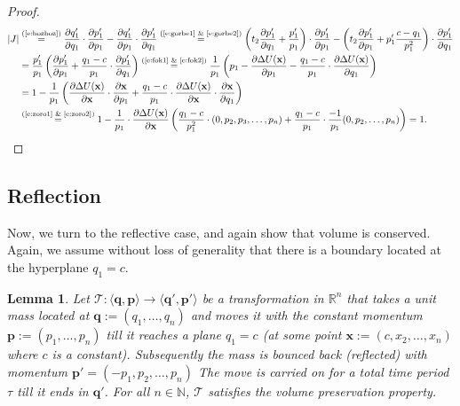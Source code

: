 \documentclass{article} %
\newtheorem{lemma}{Lemma}
\newcommand{\tuple}[1] {\langle #1 \rangle}
\newcommand{\bvec}[1]{\textbf{#1}}
\begin{document}
\begin{proof}
\begin{align*}\label{e:zarrafe1}
|J|
&\overset{\text{(\ref{e:bozboz})}}
=
\frac{\partial q'_1}{\partial q_1} \cdot \frac{\partial p'_1}{\partial p_1}
-
\frac{\partial q'_1}{\partial p_1} \cdot \frac{\partial p'_1}{\partial q_1}
\overset{\text{(\ref{e:gorbe1} \& \ref{e:gorbe2})}}
=
\left(
t_2 \frac{\partial p'_1}{\partial q_1}
+
\frac{p'_1}{p_1}
\right)
\cdot 
\frac{\partial p'_1}{\partial p_1}
-
\left(
t_2 \frac{\partial p'_1}{\partial p_1}
+
p'_1 \frac{c-q_1}{p_1^2}
\right)
\cdot \frac{\partial p'_1}{\partial q_1}\\
&= 
\frac{p'_1}{p_1} 
\left(
\frac{\partial p'_1}{\partial p_1} 
+
\frac{q_1 - c}{p_1} 
\cdot
\frac{\partial p'_1}{\partial q_1}
\right)
\overset{\text{(\ref{e:fok1} \& \ref{e:fok2})}}
=
\frac{1}{p_1} 
\left(
p_1 -
\frac{\partial \Delta U(\bvec{x})}{\partial p_1}%
-
\frac{q_1 - c}{p_1} 
\cdot
\frac{\partial{\Delta U(\bvec{x})}}{\partial q_1}%
\right)
\\
&=
1 - 
\frac{1}{p_1} 
\left(
\frac{\partial \Delta U(\bvec{x})}{\partial \bvec{x}}
\cdot
\frac{\partial \bvec{x}}{\partial p_1}%
+
\frac{q_1 - c}{p_1} 
\cdot
\frac{\partial{\Delta U(\bvec{x})}}
{\partial \bvec{x}}
\cdot
\frac{\partial \bvec{x}}
{\partial q_1}%
\right)
\\
&\overset{\text{(\ref{e:zoro1} \& \ref{e:zoro2})}}
=
1 - 
\frac{1}{p_1} \cdot
\frac{\partial \Delta U(\bvec{x})}{\partial \bvec{x}} 
\left(
\frac{q_1 - c}{p_1^2}
\cdot
(0, p_2, p_3, \ldots, p_n)
+
\frac{q_1 - c}{p_1} 
\cdot
\frac{-1}{p_1}(0, p_2, \ldots, p_n)
\right)
= 1.
\end{align*}
\end{proof}    








\subsection{Reflection}

Now, we turn to the reflective case, and again show that volume is conserved.  Again, we assume without loss of generality that there is a boundary located at the hyperplane $q_1=c$.



\begin{lemma} 
\label{lemma2}
Let $\mathcal{T}: \tuple{\bvec{q}, \bvec{p}} \rightarrow \tuple{\bvec{q}', \bvec{p}'}$ be a transformation in $\mathbb{R}^n$
that takes a unit mass located at $\bvec{q} := (q_1, \ldots, q_n)$ and moves it with the constant momentum $\bvec{p} := (p_1, \ldots, p_n)$ till it reaches a plane $q_1 = c$ (at some point $\bvec{x} := (c, x_2, \ldots, x_n)$ where 
$c$ is a constant).
Subsequently the mass is bounced back (reflected) with momentum  
$
\bvec{p}' = \left( -p_1, p_2, \ldots, p_n \right)
$
The move is carried on for a total time period $\tau$ till it ends in $\bvec{q}'$. 
For all $n \in \mathbb{N}$, $\mathcal{T}$ satisfies the volume preservation property.
\end{lemma}
\end{document}
